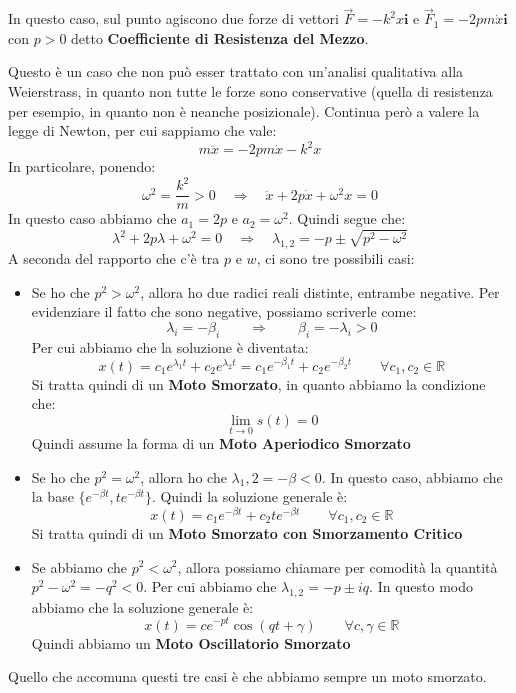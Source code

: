 \documentclass[11pt,a4paper,twoside]{article}
\theoremstyle{definition}
\begin{document}
In questo caso, sul punto agiscono due forze di vettori $\vec F = -k^2x \mathbf i$ e $\vec F_1 = -2pm \dot x \mathbf i$ con $p>0$ detto \textbf{Coefficiente di Resistenza del Mezzo}.
\begin{center}
\end{center}
Questo è un caso che non può esser trattato con un'analisi qualitativa alla Weierstrass, in quanto non tutte le forze sono conservative (quella di resistenza per esempio, in quanto non è neanche posizionale). Continua però a valere la legge di Newton, per cui sappiamo che vale:
\[ m\ddot x = -2pm \dot x - k^2 x \]
In particolare, ponendo:
\[\omega^2 = \frac{k^2}m>0 \quad \Rightarrow \quad \ddot x + 2p \dot x + \omega^2x = 0\]
In questo caso abbiamo che $a_1 = 2p$ e $a_2 = \omega^2$. Quindi segue che:
\[ \lambda^2 + 2p\lambda + \omega^2 = 0\quad \Rightarrow \quad \lambda_{1,2} = -p \pm \sqrt{p^2-\omega^2} \]
A seconda del rapporto che c'è tra $p$ e $w$, ci sono tre possibili casi:
\begin{itemize}
	\item Se ho che $p^2>\omega^2$, allora ho due radici reali distinte, entrambe negative. Per evidenziare il fatto che sono negative, possiamo scriverle come:
		\[ \lambda_i = - \beta_i \qquad \Rightarrow \qquad \beta_i = -\lambda_i > 0 \]
		Per cui abbiamo che la soluzione è diventata:
		\[ x(t) = c_1e^{\lambda_1t} + c_2e^{\lambda_2t} = c_1e^{-\beta_1t} + c_2e^{-\beta_2t} \qquad \forall c_1,c_2 \in \mathbb R\]
		Si tratta quindi di un \textbf{Moto Smorzato}, in quanto abbiamo la condizione che:
		\[ \lim_{t \to 0}s(t) =0 \]
		Quindi assume la forma di un \textbf{Moto Aperiodico Smorzato}
	\item Se ho che $p^2 = \omega^2$, allora ho che $\lambda_1,2 = -\beta<0$. In questo caso, abbiamo che la base $\{ e^{-\beta t}, te^{-\beta t} \}$. Quindi la soluzione generale è:
		\[ x(t) = c_1 e^{-\beta t} + c_2 t e^{-\beta t}\qquad \forall c_1,c_2 \in \mathbb R \]
		Si tratta quindi di un \textbf{Moto Smorzato con Smorzamento Critico}
	\item Se abbiamo che $p^2< \omega^2$, allora possiamo chiamare per comodità la quantità $p^2 - \omega^2 = -q^2 <0$. Per cui abbiamo che $\lambda_{1,2} = -p \pm iq$. In questo modo abbiamo che la soluzione generale è:
		\[ x(t) = ce^{-pt}\cos(qt + \gamma) \qquad \forall c, \gamma\in \mathbb R\]
		Quindi abbiamo un \textbf{Moto Oscillatorio Smorzato}
\end{itemize}
Quello che accomuna questi tre casi è che abbiamo sempre un moto smorzato.
\end{document}
